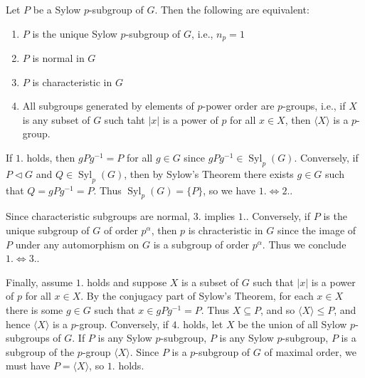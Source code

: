 \documentclass[12pt, a4paper, twoside, openright, titlepage]{book}
\begin{document}
\begin{cor}{}{}
    Let $P$ be a Sylow $p$-subgroup of $G$. Then the following are equivalent: \begin{enumerate}
        \item $P$ is the unique Sylow $p$-subgroup of $G$, i.e., $n_p = 1$
        \item $P$ is normal in $G$
        \item $P$ is characteristic in $G$
        \item All subgroups generated by elements of $p$-power order are $p$-groups, i.e., if $X$ is any subset of $G$ such taht $|x|$ is a power of $p$ for all $x \in X$, then $\langle X \rangle$ is a $p$-group.
    \end{enumerate}
\end{cor}
\begin{proof*}{}{}
    If $1.$ holds, then $gPg^{-1} = P$ for all $g \in G$ since $gPg^{-1} \in \operatorname{Syl}_p(G)$. Conversely, if $P \vartriangleleft G$ and $Q \in \operatorname{Syl}_p(G)$, then by Sylow's Theorem there exists $g \in G$ such that $Q = gPg^{-1} = P$. Thus $\operatorname{Syl}_p(G) = \{P\}$, so we have $1. \iff 2.$.

    Since characteristic subgroups are normal, $3.$ implies $1.$. Conversely, if $P$ is the unique subgroup of $G$ of order $p^{\alpha}$, then $p$ is chracteristic in $G$ since the image of $P$ under any automorphism on $G$ is a subgroup of order $p^{\alpha}$. Thus we conclude $1.\iff 3.$.

    Finally, assume $1.$ holds and suppose $X$ is a subset of $G$ such that $|x|$ is a power of $p$ for all $x \in X$. By the conjugacy part of Sylow's Theorem, for each $x \in X$ there is some $g \in G$ such that $x \in gPg^{-1} = P$. Thus $X \subseteq P$, and so $\langle X\rangle \leq P$, and hence $\langle X\rangle$ is a $p$-group. Conversely, if $4.$ holds, let $X$ be the union of all Sylow $p$-subgroups of $G$. If $P$ is any Sylow $p$-subgroup, $P$ is any Sylow $p$-subgroup, $P$ is a subgroup of the $p$-group $\langle X\rangle$. Since $P$ is a $p$-subgroup of $G$ of maximal order, we must have $P = \langle X\rangle$, so $1.$ holds.
\end{proof*}
\end{document}
